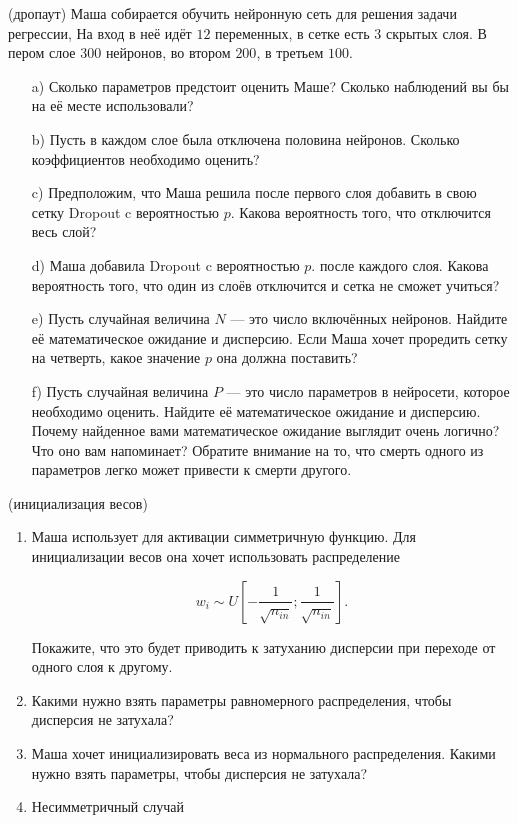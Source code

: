 \begin{problem}{(дропаут)}
Маша собирается обучить нейронную сеть для решения задачи регрессии, На вход в неё идёт $12$ переменных, в сетке есть $3$ скрытых слоя. В пером слое $300$ нейронов, во втором $200$, в третьем $100$. 

	\begin{enumerate}
		\item[a)] Сколько параметров предстоит оценить Маше?  Сколько наблюдений вы бы на её месте использовали? 
		\item[b)] Пусть в каждом слое была отключена половина нейронов. Сколько коэффициентов необходимо оценить?
		\item[c)] Предположим, что Маша решила после первого слоя добавить в свою сетку Dropout c вероятностью $p$.  Какова вероятность того, что отключится весь слой? 
		\item[d)] Маша добавила Dropout c вероятностью $p$. после каждого слоя. Какова вероятность того, что один из слоёв отключится и сетка не сможет учиться? 
		\item[e)] Пусть случайная величина $N$ --- это число включённых нейронов. Найдите её математическое ожидание и дисперсию. Если Маша хочет проредить сетку на четверть, какое значение $p$ она должна поставить? 
		\item[f)] Пусть случайная величина $P$ --- это число параметров в нейросети, которое необходимо оценить. Найдите её математическое ожидание и дисперсию. Почему найденное вами математическое ожидание выглядит очень логично? Что оно вам напоминает? Обратите внимание на то, что смерть одного из параметров легко может привести к смерти другого.
	\end{enumerate}
\end{problem}



\begin{problem}{(инициализация весов)}
    \begin{enumerate}
        \item Маша использует для активации симметричную функцию. Для инициализации весов она хочет использовать распределение 
        
        $$
        w_i \sim U \left[ - \frac{1}{\sqrt{n_{in}}};  \frac{1}{\sqrt{n_{in}}}  \right].
        $$
        
        Покажите, что это будет приводить к затуханию дисперсии при переходе от одного слоя к другому. 
        
        \item Какими нужно взять параметры равномерного распределения, чтобы дисперсия не затухала? 
        
        \item Маша хочет инициализировать веса из нормального распределения. Какими нужно взять параметры, чтобы дисперсия не затухала? 
        
        \item Несимметричный случай
    \end{enumerate}
\end{problem}

